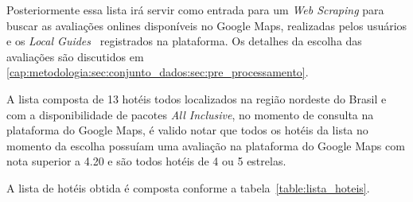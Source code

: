 Posteriormente essa lista irá servir como entrada para um \emph{Web Scraping} para buscar as avaliações onlines disponíveis no Google Maps, realizadas pelos usuários e os \emph{Local Guides}~\cite{google2022localguides} registrados na plataforma. Os detalhes da escolha das avaliações são discutidos em \ref{cap:metodologia:sec:conjunto_dados:sec:pre_processamento}.

A lista composta de 13 hotéis todos localizados na região nordeste do Brasil e com a disponibilidade de pacotes \emph{All Inclusive}, no momento de consulta na plataforma do Google Maps, é valido notar que todos os hotéis da lista no momento da escolha possuíam uma avaliação na plataforma do Google Maps com nota superior a 4.20 e são todos hotéis de 4 ou 5 estrelas.

A lista de hotéis obtida é composta conforme a tabela~\ref{table:lista_hoteis}.


